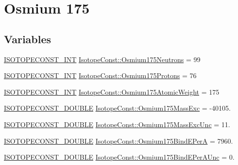 \hypertarget{group___isotope_const-_osmium-_os175}{}\section{Osmium 175}
\label{group___isotope_const-_osmium-_os175}
\subsection*{Variables}
\begin{DoxyCompactItemize}
\item 
\mbox{\hyperlink{group___isotope_const-_macros_ga5f18360b3e99483a35c32d789e62621c}{I\+S\+O\+T\+O\+P\+E\+C\+O\+N\+S\+T\+\_\+\+I\+NT}} \mbox{\hyperlink{group___isotope_const-_osmium-_os175_ga4ff2feba03e0610a901d08ae5816c059}{Isotope\+Const\+::\+Osmium175\+Neutrons}} = 99
\item 
\mbox{\hyperlink{group___isotope_const-_macros_ga5f18360b3e99483a35c32d789e62621c}{I\+S\+O\+T\+O\+P\+E\+C\+O\+N\+S\+T\+\_\+\+I\+NT}} \mbox{\hyperlink{group___isotope_const-_osmium-_os175_gad80b90f66017fdaf087fe63bc20695ed}{Isotope\+Const\+::\+Osmium175\+Protons}} = 76
\item 
\mbox{\hyperlink{group___isotope_const-_macros_ga5f18360b3e99483a35c32d789e62621c}{I\+S\+O\+T\+O\+P\+E\+C\+O\+N\+S\+T\+\_\+\+I\+NT}} \mbox{\hyperlink{group___isotope_const-_osmium-_os175_ga68d651baca5291ae24003e9ae0e879c8}{Isotope\+Const\+::\+Osmium175\+Atomic\+Weight}} = 175
\item 
\mbox{\hyperlink{group___isotope_const-_macros_ga8f45a7272ce02c0b4c65c44636ed719a}{I\+S\+O\+T\+O\+P\+E\+C\+O\+N\+S\+T\+\_\+\+D\+O\+U\+B\+LE}} \mbox{\hyperlink{group___isotope_const-_osmium-_os175_gaf1f9f6203ce566f0e4068112266f80d7}{Isotope\+Const\+::\+Osmium175\+Mass\+Exc}} = -\/40105.
\item 
\mbox{\hyperlink{group___isotope_const-_macros_ga8f45a7272ce02c0b4c65c44636ed719a}{I\+S\+O\+T\+O\+P\+E\+C\+O\+N\+S\+T\+\_\+\+D\+O\+U\+B\+LE}} \mbox{\hyperlink{group___isotope_const-_osmium-_os175_gab37a73d946258de14fa55febcf37697b}{Isotope\+Const\+::\+Osmium175\+Mass\+Exc\+Unc}} = 11.
\item 
\mbox{\hyperlink{group___isotope_const-_macros_ga8f45a7272ce02c0b4c65c44636ed719a}{I\+S\+O\+T\+O\+P\+E\+C\+O\+N\+S\+T\+\_\+\+D\+O\+U\+B\+LE}} \mbox{\hyperlink{group___isotope_const-_osmium-_os175_ga2d6c236720e29dd7ca31d141ead0cc20}{Isotope\+Const\+::\+Osmium175\+Bind\+E\+PerA}} = 7960.
\item 
\mbox{\hyperlink{group___isotope_const-_macros_ga8f45a7272ce02c0b4c65c44636ed719a}{I\+S\+O\+T\+O\+P\+E\+C\+O\+N\+S\+T\+\_\+\+D\+O\+U\+B\+LE}} \mbox{\hyperlink{group___isotope_const-_osmium-_os175_gaedbee545d68a3e1fc7791326d27b60b5}{Isotope\+Const\+::\+Osmium175\+Bind\+E\+Per\+A\+Unc}} = 0.

\end{DoxyCompactItemize}

